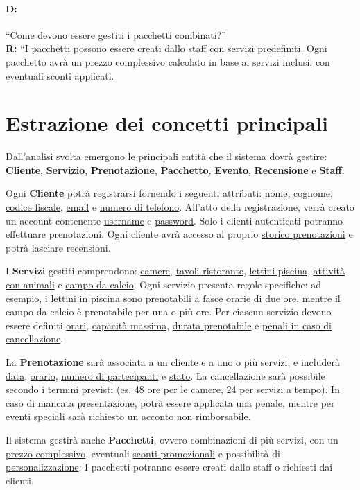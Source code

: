 \documentclass[a4paper,11pt]{report}
\begin{document}
\paragraph{D:}
“Come devono essere gestiti i pacchetti combinati?”
\\ {\bf R:} “I pacchetti possono essere creati dallo staff con servizi predefiniti. Ogni pacchetto avrà un prezzo complessivo calcolato in base ai
servizi inclusi, con eventuali sconti applicati.

\section{Estrazione dei concetti principali}
Dall'analisi svolta emergono le principali entità che il sistema dovrà gestire: \textbf{Cliente}, \textbf{Servizio}, \textbf{Prenotazione},
\textbf{Pacchetto}, \textbf{Evento}, \textbf{Recensione} e \textbf{Staff}.

Ogni \textbf{Cliente} potrà registrarsi fornendo i seguenti attributi: \underline{nome}, \underline{cognome}, \underline{codice fiscale},
\underline{email} e \underline{numero di telefono}. All'atto della registrazione, verrà creato un account contenente \underline{username} e \underline{password}. Solo i clienti
autenticati potranno effettuare prenotazioni. Ogni cliente avrà accesso al proprio \underline{storico prenotazioni} e potrà lasciare recensioni.

I \textbf{Servizi} gestiti comprendono: \underline{camere}, \underline{tavoli ristorante}, \underline{lettini piscina}, \underline{attività con
	animali} e \underline{campo da calcio}. Ogni servizio presenta regole specifiche: ad esempio, i lettini in piscina sono prenotabili a fasce orarie di
due ore, mentre il campo da calcio è prenotabile per una o più ore. Per ciascun servizio devono essere definiti \underline{orari}, \underline{capacità massima},
\underline{durata prenotabile} e \underline{penali in caso di cancellazione}.

La \textbf{Prenotazione} sarà associata a un cliente e a uno o più servizi, e includerà \underline{data}, \underline{orario}, \underline{numero di
	partecipanti} e \underline{stato}. La cancellazione sarà possibile secondo i termini previsti (es. 48 ore per le camere, 24 per servizi a tempo). In caso di
mancata presentazione, potrà essere applicata una \underline{penale}, mentre per eventi speciali sarà richiesto un \underline{acconto non rimborsabile}.

Il sistema gestirà anche \textbf{Pacchetti}, ovvero combinazioni \newline di più servizi, con un \underline{prezzo complessivo},
eventuali \underline{sconti promozionali} e possibilità \newline di \underline{personalizzazione}. I pacchetti potranno essere creati dallo staff o richiesti dai clienti.
\end{document}
